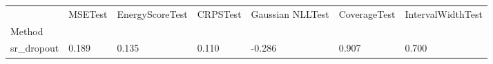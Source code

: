\begin{tabular}{lllllll}
\toprule
 & MSETest & EnergyScoreTest & CRPSTest & Gaussian NLLTest & CoverageTest & IntervalWidthTest \\
Method &  &  &  &  &  &  \\
\midrule
sr_dropout & 0.189 & 0.135 & 0.110 & -0.286 & 0.907 & 0.700 \\
\bottomrule
\end{tabular}
